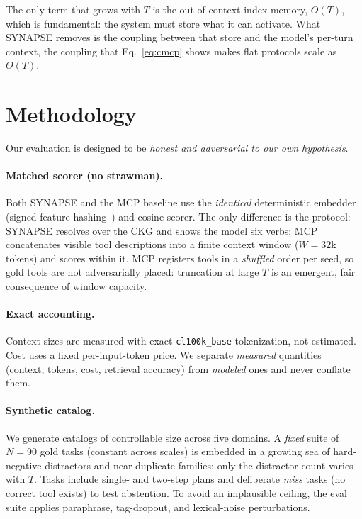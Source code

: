 \documentclass[11pt]{article}
\theoremstyle{plain}
\theoremstyle{definition}
\begin{document}
The only term that grows with $T$ is the out-of-context index memory, $O(T)$,
which is fundamental: the system must store what it can activate. What SYNAPSE
removes is the coupling between that store and the model's per-turn context, the
coupling that Eq.~\eqref{eq:cmcp} shows makes flat protocols scale as $\Theta(T)$.

\section{Methodology}
Our evaluation is designed to be \emph{honest and adversarial to our own
hypothesis}.

\paragraph{Matched scorer (no strawman).} Both SYNAPSE and the MCP baseline use
the \emph{identical} deterministic embedder (signed feature
hashing~\citep{weinberger2009featurehashing}) and cosine scorer. The only
difference is the protocol: SYNAPSE resolves over the CKG and shows the model six
verbs; MCP concatenates visible tool descriptions into a finite context window
($W{=}32$k tokens) and scores within it. MCP registers tools in a
\emph{shuffled} order per seed, so gold tools are not adversarially placed:
truncation at large $T$ is an emergent, fair consequence of window capacity.

\paragraph{Exact accounting.} Context sizes are measured with exact
\texttt{cl100k\_base} tokenization, not estimated. Cost uses a fixed
per-input-token price. We separate \emph{measured} quantities (context, tokens,
cost, retrieval accuracy) from \emph{modeled} ones and never conflate them.

\paragraph{Synthetic catalog.} We generate catalogs of controllable size across
five domains. A \emph{fixed} suite of $N{=}90$ gold tasks (constant across
scales) is embedded in a growing sea of hard-negative distractors and
near-duplicate families; only the distractor count varies with $T$. Tasks
include single- and two-step plans and deliberate \emph{miss} tasks (no correct
tool exists) to test abstention. To avoid an implausible ceiling, the eval suite
applies paraphrase, tag-dropout, and lexical-noise perturbations.
\end{document}
